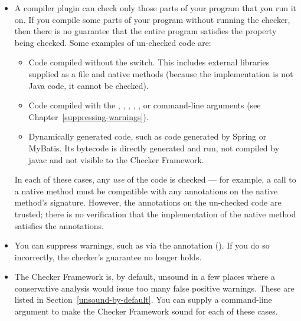 \begin{itemize}

\item
  A compiler plugin can check only those parts of your program that you run
  it on.  If you compile some parts of your program without running the
  checker, then there is no guarantee that the entire program satisfies the
  property being checked.  Some examples of un-checked code are:

  \begin{itemize}
  \item
    Code compiled without the  switch.  This includes
    external libraries supplied as a  file and native methods
    (because the implementation is not Java code, it cannot be checked).
  \item
    Code compiled with the , ,
    , , , or
    command-line arguments (see Chapter~\ref{suppressing-warnings}).
  \item
    Dynamically generated code, such as code generated by Spring or MyBatis.
    Its bytecode is directly generated and run, not compiled by javac and
    not visible to the Checker Framework.
  \end{itemize}

  In each of these cases, any \emph{use} of the code is checked --- for
  example, a call to a native method must be compatible with any
  annotations on the native method's signature.
  However, the annotations on the un-checked code are trusted; there is no
  verification that the implementation of the native method satisfies the
  annotations.

\item
  You can suppress warnings, such as via the 
  annotation ().  If you do so
  incorrectly, the checker's guarantee no longer holds.

\item
  The Checker Framework is, by default, unsound in a few places where a
  conservative analysis would issue too many false positive warnings.
  These are listed in Section~\ref{unsound-by-default}.
  You can supply a command-line argument to make the Checker Framework
  sound for each of these cases.



\end{itemize}

